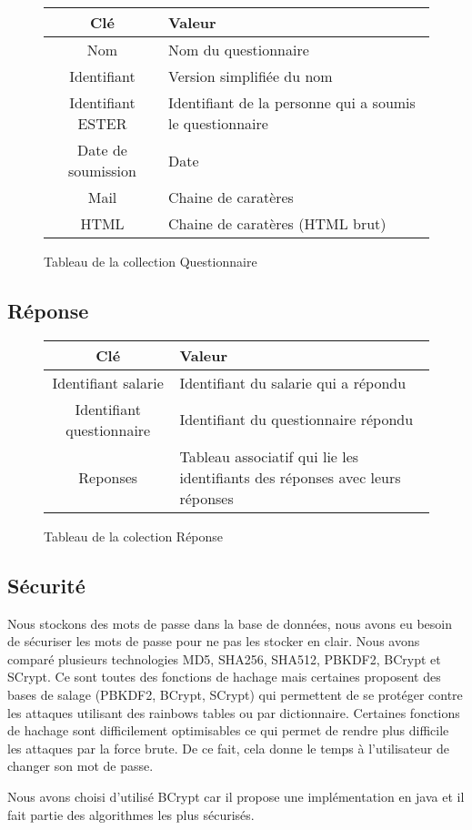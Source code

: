 \begin{figure}[H]
    \begin{center}
        \begin{tabularx}{17cm}{|c|X|}
            \hline
            Clé & Valeur  \tabularnewline 
            \hline
            Nom & 
            Nom du questionnaire \tabularnewline 
            Identifiant & 
            Version simplifiée du nom \tabularnewline
            Identifiant ESTER & 
            Identifiant de la personne qui a soumis le questionnaire \tabularnewline
            Date de soumission & 
            Date \tabularnewline
            Mail & 
            Chaine de caratères \tabularnewline
            HTML & 
            Chaine de caratères (HTML brut) \tabularnewline
            \hline
        \end{tabularx}
    \end{center}
    \caption{Tableau de la collection Questionnaire}
\end{figure}

\subsection{Réponse}

\begin{figure}[H]
    \begin{center}
        \begin{tabularx}{17cm}{|c|X|}
            \hline
            Clé & Valeur  \tabularnewline 
            \hline
            Identifiant salarie & 
            Identifiant du salarie qui a répondu \tabularnewline
            Identifiant questionnaire & 
            Identifiant du questionnaire répondu \tabularnewline
            Reponses & 
            Tableau associatif qui lie les identifiants des réponses 
            avec leurs réponses \tabularnewline
            \hline
        \end{tabularx}
    \end{center}
    \caption{Tableau de la colection Réponse}
\end{figure}
\subsection{Sécurité}

Nous stockons des mots de passe dans la base de données, nous avons eu besoin de sécuriser les mots de passe pour ne pas les stocker en clair.
Nous avons comparé plusieurs technologies MD5, SHA256, SHA512, PBKDF2, BCrypt et SCrypt. Ce sont toutes des fonctions de hachage mais certaines proposent des bases de salage (PBKDF2, BCrypt, SCrypt) qui permettent de se protéger contre les attaques utilisant des rainbows tables ou par dictionnaire. 
Certaines fonctions de hachage sont difficilement optimisables ce qui permet de rendre plus difficile les attaques par la force brute. De ce fait, cela donne le temps à l'utilisateur de changer son mot de passe.     

Nous avons choisi d'utilisé BCrypt car il propose une implémentation en java et il fait partie des algorithmes les plus sécurisés.